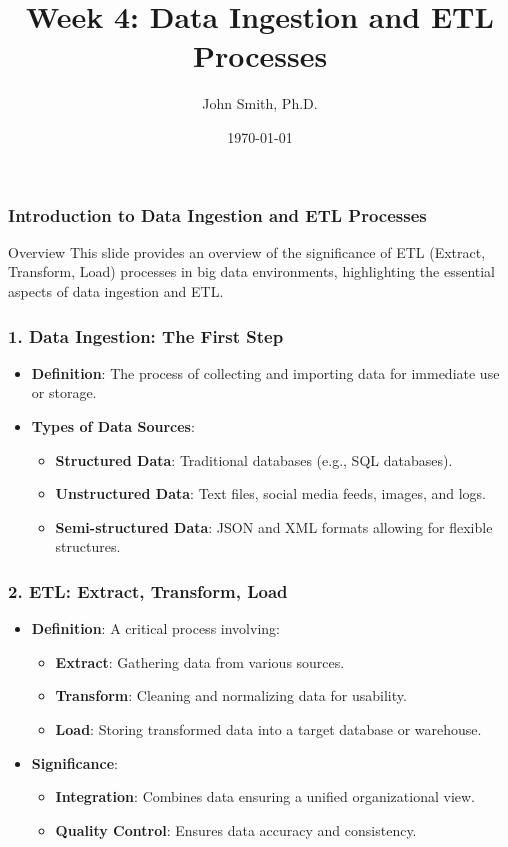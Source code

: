 \documentclass[aspectratio=169]{beamer}
\title[Week 4: Data Ingestion and ETL Processes]{Week 4: Data Ingestion and ETL Processes}
\author[J. Smith]{John Smith, Ph.D.}
\institute[University Name]{
  Department of Computer Science\\
  University Name\\
  \vspace{0.3cm}
  Email: email@university.edu\\
  Website: www.university.edu
}
\date{\today}
\begin{document}
\frame{\titlepage}

\begin{frame}[fragile]
    \frametitle{Introduction to Data Ingestion and ETL Processes}
    \begin{block}{Overview}
        This slide provides an overview of the significance of ETL (Extract, Transform, Load) processes in big data environments, highlighting the essential aspects of data ingestion and ETL.
    \end{block}
\end{frame}

\begin{frame}[fragile]
    \frametitle{1. Data Ingestion: The First Step}
    \begin{itemize}
        \item \textbf{Definition}: The process of collecting and importing data for immediate use or storage.
        \item \textbf{Types of Data Sources}:
        \begin{itemize}
            \item \textbf{Structured Data}: Traditional databases (e.g., SQL databases).
            \item \textbf{Unstructured Data}: Text files, social media feeds, images, and logs.
            \item \textbf{Semi-structured Data}: JSON and XML formats allowing for flexible structures.
        \end{itemize}
    \end{itemize}
\end{frame}

\begin{frame}[fragile]
    \frametitle{2. ETL: Extract, Transform, Load}
    \begin{itemize}
        \item \textbf{Definition}: A critical process involving:
        \begin{itemize}
            \item \textbf{Extract}: Gathering data from various sources.
            \item \textbf{Transform}: Cleaning and normalizing data for usability.
            \item \textbf{Load}: Storing transformed data into a target database or warehouse.
        \end{itemize}
        \item \textbf{Significance}:
        \begin{itemize}
            \item \textbf{Integration}: Combines data ensuring a unified organizational view.
            \item \textbf{Quality Control}: Ensures data accuracy and consistency.
        \end{itemize}
    \end{itemize}
\end{frame}
\end{document}
